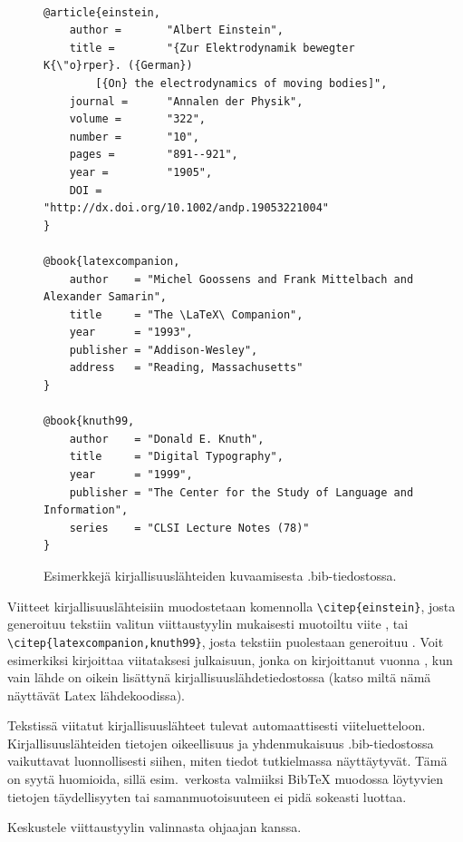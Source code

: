 \begin{figure}[ht]
    \centering
    \begin{scriptsize}
\begin{verbatim}

@article{einstein,
    author =       "Albert Einstein",
    title =        "{Zur Elektrodynamik bewegter K{\"o}rper}. ({German})
        [{On} the electrodynamics of moving bodies]",
    journal =      "Annalen der Physik",
    volume =       "322",
    number =       "10",
    pages =        "891--921",
    year =         "1905",
    DOI =          "http://dx.doi.org/10.1002/andp.19053221004"
}

@book{latexcompanion,
    author    = "Michel Goossens and Frank Mittelbach and Alexander Samarin",
    title     = "The \LaTeX\ Companion",
    year      = "1993",
    publisher = "Addison-Wesley",
    address   = "Reading, Massachusetts"
}

@book{knuth99,
    author    = "Donald E. Knuth",
    title     = "Digital Typography",
    year      = "1999",
    publisher = "The Center for the Study of Language and Information",
    series    = "CLSI Lecture Notes (78)"
}
\end{verbatim}
\end{scriptsize}
    \caption{Esimerkkejä kirjallisuuslähteiden kuvaamisesta .bib-tiedostossa.}
    \label{bibexamples-fi}
\end{figure}

Viitteet kirjallisuuslähteisiin muodostetaan komennolla \texttt{\textbackslash citep\{einstein\}}, josta generoituu tekstiin valitun viittaustyylin mukaisesti muotoiltu viite \citep{einstein}, tai \texttt{\textbackslash citep\{latexcompanion,knuth99\}}, josta tekstiin puolestaan generoituu \citep{latexcompanion,knuth99}. 
Voit esimerkiksi kirjoittaa \citep{einstein} viitataksesi julkaisuun, jonka on kirjoittanut \citeauthor{einstein} vuonna \citeyear{einstein}, kun vain lähde \citet{einstein} on oikein lisättynä kirjallisuuslähdetiedostossa (katso miltä nämä näyttävät Latex lähdekoodissa).

Tekstissä viitatut kirjallisuuslähteet tulevat automaattisesti viiteluetteloon. Kirjallisuuslähteiden tietojen oikeellisuus ja yhdenmukaisuus .bib-tiedostossa vaikuttavat luonnollisesti siihen, miten tiedot tutkielmassa näyttäytyvät. Tämä on syytä huomioida, sillä esim.\ verkosta valmiiksi {Bib\TeX} muodossa löytyvien tietojen täydellisyyten tai samanmuotoisuuteen ei pidä sokeasti luottaa.  


Keskustele viittaustyylin valinnasta ohjaajan kanssa. 

